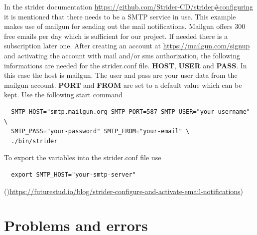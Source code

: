 In the strider documentation \url{https://github.com/Strider-CD/strider#configuring} it is mentioned that there needs to be a SMTP service in use. This
example makes use of mailgun for sending out the mail notifications. Mailgun offers 300 free emails per day which is sufficient for our project. If needed
there is a subscription later one. After creating an account at \url{https://mailgun.com/signup} and activating the account with mail and/or sms authorization,
the following informations are needed for the strider.conf file. \textbf{HOST}, \textbf{USER} and \textbf{PASS}. In this case the host is mailgun. The user
and pass are your user data from the mailgun account. \textbf{PORT} and \textbf{FROM} are set to a default value which can be kept.
Use the following start command

\begin{lstlisting}
  SMTP_HOST="smtp.mailgun.org SMTP_PORT=587 SMTP_USER="your-username" \
  SMTP_PASS="your-password" SMTP_FROM="your-email" \
  ./bin/strider
\end{lstlisting}

To export the variables into the strider.conf file use

\begin{lstlisting}
  export SMTP_HOST="your-smtp-server"
\end{lstlisting}

()\url{https://futurestud.io/blog/strider-configure-and-activate-email-notifications})

\newpage
\section{Problems and errors}
\label{section:Problems and errors}

